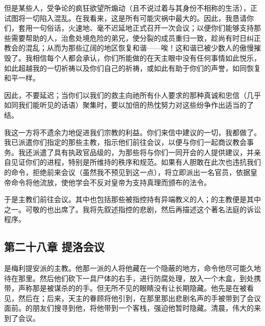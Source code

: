 但是某些人，受争论的疯狂欲望所煽动（且不说过着与其身份不相称的生活），正试图将一切陷入混乱。在我看来，这是所有可能灾祸中最大的。因此，我恳请你们，套用一句俗话，火速地、毫不迟延地正式召开一次会议；以便你们能够支持那些需要帮助的人，治愈处境危险的弟兄，使分裂的成员重归一致，趁尚有时日纠正教会的混乱；从而为那些辽阔的地区恢复和谐——唉！这和谐已被少数人的傲慢摧毁了。我相信每个人都会承认，你们所能做的在天主眼中没有任何事情如此悦乐，如此超越我的一切祈祷以及你们自己的祈祷，或如此有助于你们的声誉，如同恢复和平一样。\par

因此，不要延迟；当你们以我们的救主向祂所有仆人要求的那种真诚和忠信（几乎如同我们能听见的话语）聚集时，要以加倍的热忱努力对这些纷争作出适当的了结。\par

我这一方将不遗余力地促进我们宗教的利益。你们来信中建议的一切，我都做了。我已派遣你们指定的那些主教，指示他们前往会议，以便与你们一起商议教会事务。我还派遣了具有执政官品级的，为那些将与你们一同开会的人提供建议，并亲自见证你们的进程，特别是所维持的秩序和规范。如果有人胆敢在此次也违抗我们的命令，拒绝前来会议（虽然我不预见到这一点），将立即派出一名官员，依据皇帝命令将他流放，使他学会不反对皇帝为支持真理而颁布的法令。\par

\par

于是主教们前往会议。其中也包括那些被指控持有异端教义的人；的主教便是其中之一。可敬的也出席了。我将先叙述指控的悲剧，然后再描述这个著名法庭的诉讼程序。\par


\subsection{第二十八章 提洛会议}

是梅利提安派的主教。他那一派的人将他藏在一个隐蔽的地方，命令他尽可能久地待在那里。然后他们砍下一具尸体的右手，进行防腐处理，放入一个木盒，到处携带，声称那是被谋杀的的手。但无所不见的眼睛没有让长期隐藏。他先是在被看见，然后在；后来，天主的眷顾将他引到，在那里那出悲剧名声的手被带到了会议面前。的朋友们搜寻到他，将他带到一个客栈，强迫他暂时隐藏。清晨，伟大的来到了会议。\par

